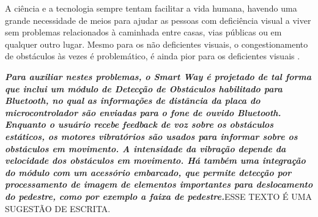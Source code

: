 A ciência e a tecnologia sempre tentam facilitar a vida humana, havendo uma grande necessidade de meios para ajudar as pessoas com deficiência visual a viver sem problemas relacionados à caminhada entre casas, vias públicas ou em qualquer outro lugar. Mesmo para os não deficientes visuais, o congestionamento de obstáculos às vezes é
problemático, é ainda pior para os deficientes visuais \cite{Therib2017}.

\textbf{\textit{Para auxiliar nestes problemas, o Smart Way é projetado de tal forma que inclui um módulo de Detecção de Obstáculos habilitado para Bluetooth, no qual as informações de distância da placa do microcontrolador são enviadas para o fone de ouvido Bluetooth. Enquanto o usuário recebe feedback de voz sobre os obstáculos estáticos, os motores vibratórios são usados para informar sobre os obstáculos em movimento. A intensidade da vibração depende da velocidade dos obstáculos em movimento. Há também uma integração do módulo com um acessório embarcado, que permite detecção por processamento de imagem de elementos importantes para deslocamento do pedestre, como por exemplo a faixa de pedestre.}}ESSE TEXTO É UMA SUGESTÃO DE ESCRITA.
